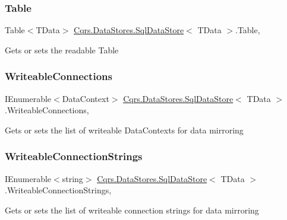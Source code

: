 \subsubsection{\texorpdfstring{Table}{Table}}
{\footnotesize\ttfamily Table$<$T\+Data$>$ \hyperlink{classCqrs_1_1DataStores_1_1SqlDataStore}{Cqrs.\+Data\+Stores.\+Sql\+Data\+Store}$<$ T\+Data $>$.Table\hspace{0.3cm}{\ttfamily [get]}, {\ttfamily [protected]}}



Gets or sets the readable Table 

\mbox{\label{classCqrs_1_1DataStores_1_1SqlDataStore_af37a59f184ce77c2204834e60c8f76aa_af37a59f184ce77c2204834e60c8f76aa}} 
\subsubsection{\texorpdfstring{Writeable\+Connections}{WriteableConnections}}
{\footnotesize\ttfamily I\+Enumerable$<$Data\+Context$>$ \hyperlink{classCqrs_1_1DataStores_1_1SqlDataStore}{Cqrs.\+Data\+Stores.\+Sql\+Data\+Store}$<$ T\+Data $>$.Writeable\+Connections\hspace{0.3cm}{\ttfamily [get]}, {\ttfamily [protected]}}



Gets or sets the list of writeable Data\+Contexts for data mirroring 

\mbox{\label{classCqrs_1_1DataStores_1_1SqlDataStore_adfdf7101f6c644f4b4ad074a2edf0a42_adfdf7101f6c644f4b4ad074a2edf0a42}} 
\subsubsection{\texorpdfstring{Writeable\+Connection\+Strings}{WriteableConnectionStrings}}
{\footnotesize\ttfamily I\+Enumerable$<$string$>$ \hyperlink{classCqrs_1_1DataStores_1_1SqlDataStore}{Cqrs.\+Data\+Stores.\+Sql\+Data\+Store}$<$ T\+Data $>$.Writeable\+Connection\+Strings\hspace{0.3cm}{\ttfamily [get]}, {\ttfamily [protected]}}



Gets or sets the list of writeable connection strings for data mirroring 


